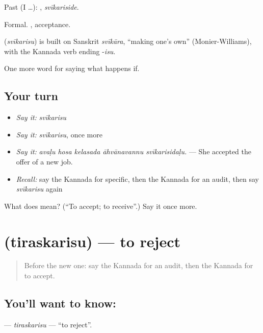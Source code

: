 Past (I …): , \emph{svīkariside}.

Formal. , acceptance.

\begin{cousinweb}
\textbf{} (\emph{svīkarisu}) is built on Sanskrit \emph{svīkāra}, \textquotedblleft{}making one's own\textquotedblright{} (Monier-Williams), with the Kannada verb ending -\emph{isu}.
\end{cousinweb}

\begin{grammarlens}[title={What you've built}]
One more word for saying what happens if.
\end{grammarlens}

\subsection*{Your turn}
\begin{itemize}
\raggedright
  \item \emph{Say it:} \emph{svīkarisu}
  \item \emph{Say it:} \emph{svīkarisu}, once more
  \item \emph{Say it:} \emph{avaḷu hosa kelasada āhvānavannu svīkarisidaḷu.} — She accepted the offer of a new job.
  \item \emph{Recall:} say the Kannada for specific, then the Kannada for an audit, then say \emph{svīkarisu} again
\end{itemize}

\begin{tcolorbox}[breakable,colback=teal!4,colframe=teal!35!black,title={Before you move on}]
What does  mean? (\textquotedblleft{}To accept; to receive\textquotedblright{}.) Say it once more.
\end{tcolorbox}
\section[\texorpdfstring{\kn{ತಿರಸ್ಕರಿಸು} (tiraskarisu)}{ತಿರಸ್ಕರಿಸು (tiraskarisu)}]{ (tiraskarisu) — to reject}

\label{lesson:KA-C425-tiraskarisu}



\begin{quote}
Before the new one: say the Kannada for an audit, then the Kannada for to accept.
\end{quote}

\subsection*{You'll want to know: }
\textbf{} — \emph{tiraskarisu} — \textquotedblleft{}to reject\textquotedblright{}.

